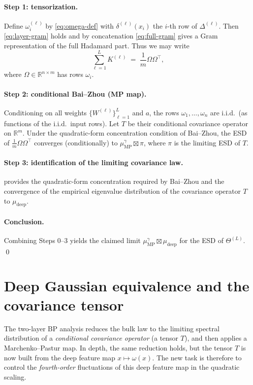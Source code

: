 \documentclass[11pt]{article}
\newcommand{\RR}{\mathbb{R}}
\begin{document}
\paragraph{Step 1: tensorization.}
Define $\omega_i^{(\ell)}$ by \eqref{eq:omega-def} with $\delta^{(\ell)}(x_i)$ the $i$-th row of $\Delta^{(\ell)}$.
Then \eqref{eq:layer-gram} holds and by concatenation \eqref{eq:full-gram} gives a Gram representation of the full Hadamard part.
Thus we may write
\[
  \sum_{\ell=1}^L K^{(\ell)} \;=\; \frac{1}{m}\Omega\Omega^\top,
\]
where $\Omega\in\RR^{n\times m}$ has rows $\omega_i$.

\paragraph{Step 2: conditional Bai--Zhou (MP map).}
Conditioning on all weights $\{W^{(\ell)}\}_{\ell=1}^L$ and $a$, the rows $\omega_1,\dots,\omega_n$ are i.i.d.\ (as functions of the i.i.d.\ input rows).
Let $T$ be their conditional covariance operator on $\RR^{m}$.
Under the quadratic-form concentration condition of Bai--Zhou, the ESD of $\frac{1}{m}\Omega\Omega^\top$ converges (conditionally) to $\mu_{\mathrm{MP}}^{\gamma}\boxtimes \pi$, where $\pi$ is the limiting ESD of $T$.

\paragraph{Step 3: identification of the limiting covariance law.}
 provides the quadratic-form concentration required by Bai--Zhou and the convergence of the empirical eigenvalue distribution of the covariance operator $T$ to $\mu_{\mathrm{deep}}$.

\paragraph{Conclusion.}
Combining Steps 0--3 yields the claimed limit $\mu_{\mathrm{MP}}^{\gamma}\boxtimes \mu_{\mathrm{deep}}$ for the ESD of $\Theta^{(L)}$.
\qed

\section{Deep Gaussian equivalence and the covariance tensor}
\label{sec:gep}

The two-layer BP analysis reduces the bulk law to the limiting spectral distribution of a \emph{conditional covariance operator} (a tensor $T$), and then applies a Marchenko--Pastur map.
In depth, the same reduction holds, but the tensor $T$ is now built from the deep feature map $x\mapsto \omega(x)$.
The new task is therefore to control the \emph{fourth-order} fluctuations of this deep feature map in the quadratic scaling.
\end{document}
